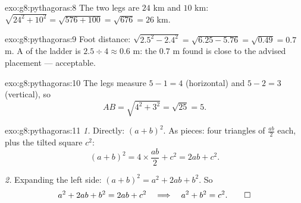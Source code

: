 \begin{solution}{exo:g8:pythagoras:8}
The two legs are $24$ km and $10$ km:
$\sqrt{24^2 + 10^2} = \sqrt{576 + 100} = \sqrt{676} = 26$ km.
\end{solution}

\begin{solution}{exo:g8:pythagoras:9}
Foot distance: $\sqrt{2.5^2 - 2.4^2} = \sqrt{6.25 - 5.76} =
\sqrt{0.49} = 0.7$ m. A  of the ladder is
$2.5 \div 4 \approx 0.6$ m: the $0.7$ m found is close to the advised
placement --- acceptable.
\end{solution}

\begin{solution}{exo:g8:pythagoras:10}
The legs measure $5 - 1 = 4$ (horizontal) and $5 - 2 = 3$
(vertical), so
\[
AB = \sqrt{4^2 + 3^2} = \sqrt{25} = 5 .
\]
\end{solution}

\begin{solution}{exo:g8:pythagoras:11}
\emph{1.} Directly: $(a + b)^2$. As pieces: four triangles of 
$\frac{ab}{2}$ each, plus the tilted square $c^2$:
\[
(a + b)^2 = 4 \times \frac{ab}{2} + c^2 = 2ab + c^2 .
\]

\emph{2.} Expanding the left side:
$(a+b)^2 = a^2 + 2ab + b^2$. So
\[
a^2 + 2ab + b^2 = 2ab + c^2
\quad\Longrightarrow\quad
a^2 + b^2 = c^2 . \qed
\]
\end{solution}

